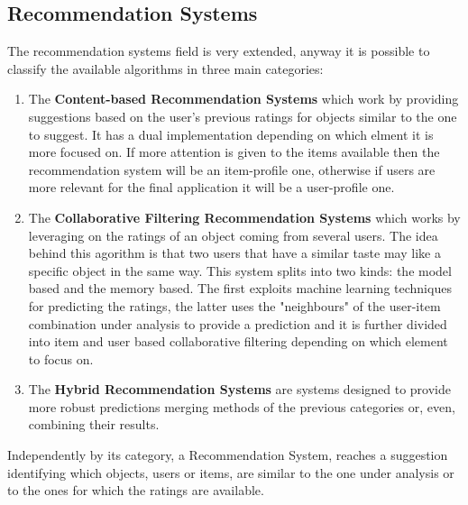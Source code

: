 \subsection{Recommendation Systems}
The recommendation systems field is very extended, anyway it is possible to
classify the available algorithms in three main categories:
\begin{enumerate}
		\item The \textbf{Content-based Recommendation Systems} which work by 
		      providing suggestions based on the user's previous ratings for
			  objects similar to the one to suggest. It has a dual
			  implementation depending on which
			  elment it is more focused on. If more attention is 
			  given to the items available then the recommendation system will
			  be an item-profile one, otherwise if users are more relevant for
			  the final application it will be a user-profile one.
		\item The \textbf{Collaborative Filtering Recommendation Systems} which
		      works
		      by leveraging on the ratings of an object coming from several
		      users. The idea behind this agorithm is that two 
			  users that have a similar taste may like a specific object in the
			  same way.
			  This system splits into two kinds: the model based and the
			  memory based. The first exploits machine learning techniques
			  for predicting the ratings, the latter uses the
			  "neighbours" of the user-item combination under analysis to
			  provide a prediction and it is further divided into item and
			  user based collaborative filtering depending on which element to
			  focus on.
		\item The \textbf{Hybrid Recommendation Systems} are systems designed
		      to provide more robust predictions merging methods of the
			  previous categories or, even, combining their results.
\end{enumerate}
Independently by its category, a Recommendation System, reaches a suggestion
identifying which objects, users or items, are similar to the one under
analysis or to the ones for which the ratings are available.
